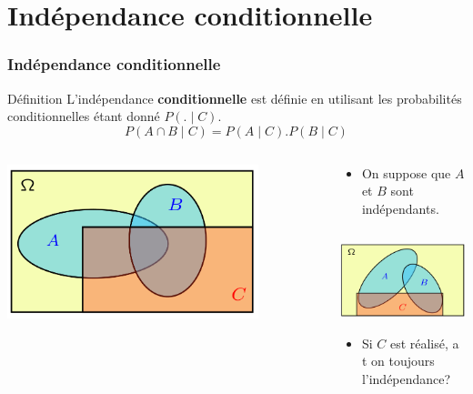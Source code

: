 \documentclass{beamer}
\begin{document}
\section{Indépendance conditionnelle}

\begin{frame}[t]
  \frametitle{Indépendance conditionnelle}
 \begin{block}{Définition}
   \scriptsize
   L'indépendance \textbf{conditionnelle} est définie en utilisant les
   probabilités conditionnelles étant donné $P(.\;|\;C)$.
   \begin{equation*}
    P(A\cap B \;|\; C) = P(A\;|\;C).P(B\;|\;C) 
   \end{equation*}
 \end{block} 
 \begin{columns}
   \begin{column}{0.5\textwidth}
      \centering
      \includegraphics[width=0.8\textwidth]{conditional_independence.png}
   \end{column}
   \begin{column}{0.5\textwidth}
   \begin{itemize}
     \tiny
     \item  On suppose que $A$ et $B$ sont indépendants.
   \end{itemize}  
   \begin{column}{0.5\textwidth}
      \includegraphics[width=4cm]{independence_vs_conditional.png}
      \begin{itemize}
        \scriptsize
        \item Si $C$ est réalisé, a t on toujours l'indépendance?
      \end{itemize}
   \end{column}
   \end{column}
 \end{columns}
\end{frame}
\end{document}
